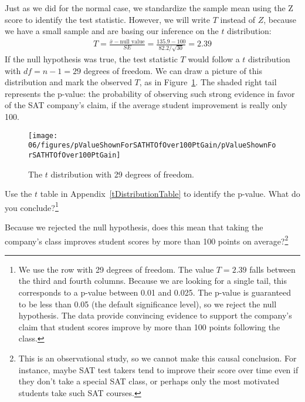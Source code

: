 Just as we did for the normal case, we standardize the sample mean using the Z score to identify the test statistic. However, we will write $T$ instead of $Z$, because we have a small sample and are basing our inference on the $t$ distribution:
\begin{eqnarray*}
T = \frac{\bar{x} - \text{null value}}{SE} = \frac{135.9 - 100}{82.2/\sqrt{30}} = 2.39
\end{eqnarray*}
If the null hypothesis was true, the test statistic $T$ would follow a $t$ distribution with $df = n-1 = 29$ degrees of freedom. We can draw a picture of this distribution and mark the observed $T$, as in Figure~\ref{pValueShownForSATHTOfOver100PtGain}. The shaded right tail represents the p-value: the probability of observing such strong evidence in favor of the SAT company's claim, if the average student improvement is really only 100.

\begin{figure}
\centering
\texttt{[image: 06/figures/pValueShownForSATHTOfOver100PtGain/pValueShownForSATHTOfOver100PtGain]}
\caption{The $t$ distribution with 29 degrees of freedom.}
\label{pValueShownForSATHTOfOver100PtGain}
\end{figure}

\begin{exercise}
Use the $t$ table in Appendix~\vref{tDistributionTable} to identify the p-value. What do you conclude?\footnote{We use the row with 29 degrees of freedom. The value $T=2.39$ falls between the third and fourth columns. Because we are looking for a single tail, this corresponds to a p-value between 0.01 and 0.025. The p-value is guaranteed to be less than 0.05 (the default significance level), so we reject the null hypothesis. The data provide convincing evidence to support the company's claim that student scores improve by more than 100 points following the class.}
\end{exercise}

\begin{exercise}
Because we rejected the null hypothesis, does this mean that taking the company's class improves student scores by more than 100 points on average?\footnote{This is an observational study, so we cannot make this causal conclusion. For instance, maybe SAT test takers tend to improve their score over time even if they don't take a special SAT class, or perhaps only the most motivated students take such SAT courses.}
\end{exercise}



